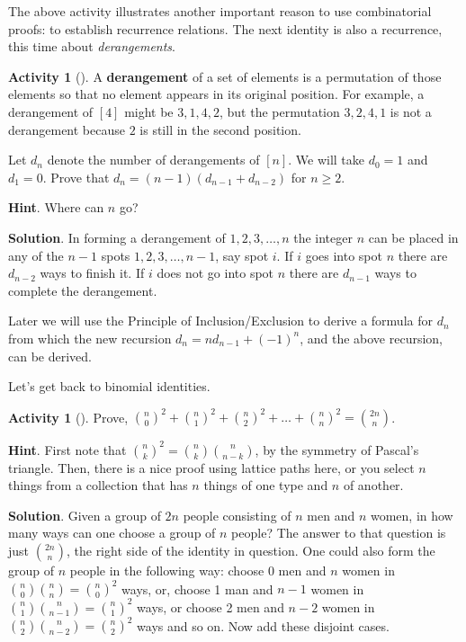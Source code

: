 \documentclass[10pt,]{book}
\newcommand{\terminology}[1]{\textbf{#1}}
\theoremstyle{plain}
\theoremstyle{definition}
\theoremstyle{definition}
\theoremstyle{definition}
\newtheorem{activity}[project]{Activity}
\theoremstyle{definition}
\numberwithin{equation}{chapter}
\begin{document}
\hypertarget{p-607}{}%
The above activity illustrates another important reason to use combinatorial proofs: to establish recurrence relations.  The next identity is also a recurrence, this time about \emph{derangements}.%
\begin{activity}[]\label{activity-43}
\hypertarget{p-608}{}%
A \terminology{derangement} of a set of elements is a permutation of those elements so that no element appears in its original position.  For example, a derangement of \([4]\) might be \(3,1,4,2\), but the permutation \(3,2,4,1\) is not a derangement because \(2\) is still in the second position.%
\par
\hypertarget{p-609}{}%
Let \(d_{n}\) denote the number of derangements of \([n]\).  We will take \(d_{0} = 1\) and \(d_{1} = 0\).  Prove that \(d_{n} = (n - 1)(d_{n - 1}+ d_{n - 2})\) for \(n \geq 2\).%
\par\smallskip%
\noindent\textbf{Hint}.\hypertarget{hint-31}{}\quad%
\hypertarget{p-610}{}%
Where can \(n\) go?%
\par\smallskip%
\noindent\textbf{Solution}.\hypertarget{solution-51}{}\quad%
\hypertarget{p-611}{}%
In forming a derangement of \(1, 2, 3, \ldots, n\) the integer \(n\) can be placed in any of the \(n - 1\) spots \(1, 2, 3, \ldots, n - 1\), say spot \(i\). If \(i\) goes into spot \(n\) there are \(d_{n - 2}\) ways to finish it. If \(i\) does not go into spot \(n\) there are \(d_{n - 1}\) ways to complete the derangement.%
\end{activity}
\hypertarget{p-612}{}%
Later we will use the Principle of Inclusion/Exclusion to derive a formula for \(d_{n}\) from which the new recursion \(d_{n} = nd_{n - 1} + \left( - 1 \right)^{n}\), and the above recursion, can be derived.%
\par
\hypertarget{p-613}{}%
Let's get back to binomial identities.%
\begin{activity}[]\label{activity-44}
\hypertarget{p-614}{}%
Prove, \(\binom{n}{0}^{2} + \binom{n}{1}^{2} + \binom{n}{2}^{2} + \ldots + \binom{n}{n}^{2} = \binom{2n}{n}\).%
\par\smallskip%
\noindent\textbf{Hint}.\hypertarget{hint-32}{}\quad%
\hypertarget{p-615}{}%
First note that \(\binom{n}{k}^2 = \binom{n}{k}\binom{n}{n-k}\), by the symmetry of Pascal's triangle.  Then, there is a nice proof using lattice paths here, or you select \(n\) things from a collection that has \(n\) things of one type and \(n\) of another.%
\par\smallskip%
\noindent\textbf{Solution}.\hypertarget{solution-52}{}\quad%
\hypertarget{p-616}{}%
Given a group of \(2n\) people consisting of \(n\) men and \(n\) women, in how many ways can one choose a group of \(n\) people? The answer to that question is just \(\binom{2n}{n}\), the right side of the identity in question. One could also form the group of \(n\) people in the following way: choose 0 men and \(n\) women in \(\binom{n}{0} \binom{n}{n} = \binom{n}{0}^{2}\) ways, or, choose 1 man and \(n - 1\) women in \(\binom{n}{1} \binom{n}{n - 1} = \binom{n}{1}^{2}\) ways, or choose 2 men and \(n - 2\) women in \(\binom{n}{2} \binom{n}{n - 2} = \binom{n}{2}^{2}\) ways and so on. Now add these disjoint cases.%
\end{activity}
\end{document}
